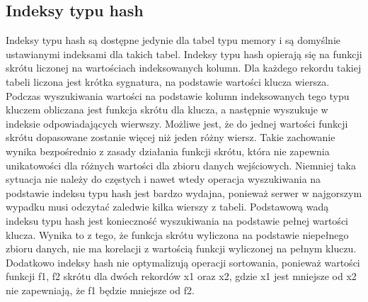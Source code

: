 
\subsection{Indeksy typu hash}
Indeksy typu hash są dostępne jedynie dla tabel typu memory i są domyślnie ustawianymi indeksami dla takich tabel. Indeksy typu hash opierają się na funkcji skrótu liczonej na wartościach indeksowanych kolumn. Dla każdego rekordu takiej tabeli liczona jest krótka sygnatura, na podstawie wartości klucza wiersza. Podczas wyszukiwania wartości na podstawie kolumn indeksowanych tego typu kluczem obliczana jest funkcja skrótu dla klucza, a następnie wyszukuje w indeksie odpowiadających wierwszy. Możliwe jest, że do jednej wartości funkcji skrótu dopasowane zostanie więcej niż jeden różny wiersz. Takie zachowanie wynika bezpośrednio z zasady działania funkcji skrótu, która nie zapewnia unikatowości dla różnych wartości dla zbioru danych wejściowych. Niemniej taka sytuacja nie należy do częstych i nawet wtedy operacja wyszukiwania na podstawie indeksu typu hash jest bardzo wydajna, ponieważ serwer w najgorszym wypadku musi odczytać zaledwie kilka wierszy z tabeli. Podstawową wadą indeksu typu hash jest konieczność wyszukiwania na podstawie pełnej wartości klucza. Wynika to z tego, że funkcja skrótu wyliczona na podstawie niepełnego zbioru danych, nie ma korelacji z wartością funkcji wyliczonej na pełnym kluczu. Dodatkowo indeksy hash nie optymalizują operacji sortowania, ponieważ wartości funkcji f1, f2 skrótu dla dwóch rekordów x1 oraz x2, gdzie x1 jest mniejsze od x2 nie zapewniają, że f1 będzie mniejsze od f2.
